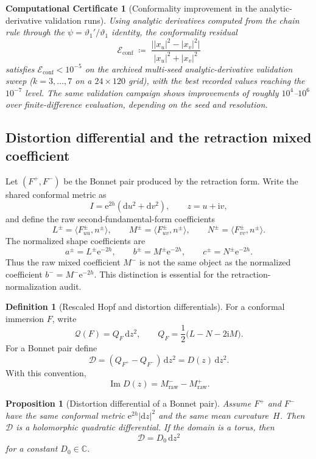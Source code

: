 \documentclass[11pt,a4paper]{article}
\theoremstyle{plain}
\newtheorem{proposition}[theorem]{Proposition}
\newtheorem{computationalcertificate}[theorem]{Computational Certificate}
\theoremstyle{definition}
\newtheorem{definition}[theorem]{Definition}
\theoremstyle{remark}
\DeclareMathOperator{\Imag}{Im}
\newcommand{\vt}[1]{\vartheta_{#1}}     %
\newcommand{\CC}{\mathbb{C}}
\newcommand{\dd}{\mathrm{d}}
\newcommand{\ee}{\mathrm{e}}
\newcommand{\ii}{\mathrm{i}}
\newcommand{\abs}[1]{\lvert #1 \rvert}
\begin{document}
\begin{computationalcertificate}[Conformality improvement in the
  analytic-derivative validation runs]
\label{prop:conformality}
Using analytic derivatives computed from the chain rule through
the $\psi = \vt{1}'/\vt{1}$ identity, the conformality residual
\[
  \mathcal{E}_{\mathrm{conf}}
  \;\coloneqq\;  \frac{\bigl|\abs{x_u}^2 - \abs{x_v}^2\bigr|}
    {\abs{x_u}^2 + \abs{x_v}^2}
\]
satisfies $\mathcal{E}_{\mathrm{conf}} < 10^{-5}$ on the archived
multi-seed analytic-derivative validation sweep ($k = 3,\ldots,7$ on a
$24 \times 120$ grid), with the best recorded values reaching the
$10^{-7}$ level.  The same validation campaign shows improvements of
roughly $10^4$--$10^6$ over finite-difference evaluation,
depending on the seed and resolution.
\end{computationalcertificate}

\subsection{Distortion differential and the retraction mixed coefficient}
\label{sec:DeltaII}

Let $(F^+,F^-)$ be the Bonnet pair produced by the retraction form.
Write the shared conformal metric as
\[
  I=\ee^{2h}(\dd u^2+\dd v^2),
  \qquad z=u+\ii v,
\]
and define the raw second-fundamental-form coefficients
\[
  L^\pm=\langle F^\pm_{uu},n^\pm\rangle,
  \qquad
  M^\pm=\langle F^\pm_{uv},n^\pm\rangle,
  \qquad
  N^\pm=\langle F^\pm_{vv},n^\pm\rangle.
\]
The normalized shape coefficients are
\[
  a^\pm=L^\pm\ee^{-2h},\qquad
  b^\pm=M^\pm\ee^{-2h},\qquad
  c^\pm=N^\pm\ee^{-2h}.
\]
Thus the raw mixed coefficient $M^-$ is not the same object as the
normalized coefficient $b^- = M^-\ee^{-2h}$.
This distinction is essential for the retraction-normalization audit.

\begin{definition}[Rescaled Hopf and distortion differentials]
\label{def:distortion-differential}
For a conformal immersion $F$, write
\[
  \mathcal Q(F)=Q_F\,\dd z^2,
  \qquad
  Q_F=\frac12\bigl(L-N-2\ii M\bigr).
\]
For a Bonnet pair define
\[
  \mathcal D=(Q_{F^+}-Q_{F^-})\,\dd z^2
  =D(z)\,\dd z^2.
\]
With this convention,
\[
  \Imag D(z)=M^-_{\mathrm{raw}}-M^+_{\mathrm{raw}}.
\]
\end{definition}

\begin{proposition}[Distortion differential of a Bonnet pair]
\label{prop:C2-distortion-holomorphic}
Assume $F^+$ and $F^-$ have the same conformal metric
$\ee^{2h}\abs{\dd z}^2$ and the same mean curvature~$H$.
Then $\mathcal D$ is a holomorphic quadratic differential.  If the
domain is a torus, then
\[
  \mathcal D=D_0\,\dd z^2
\]
for a constant $D_0\in\CC$.
\end{proposition}
\end{document}
